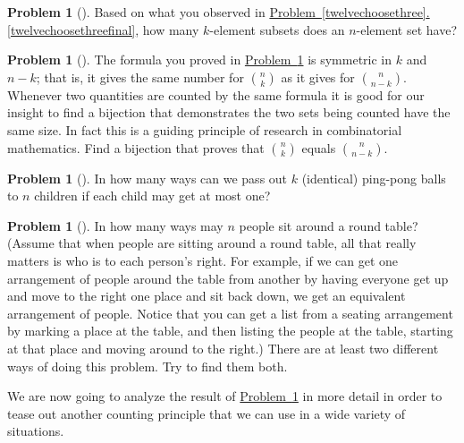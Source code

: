 \documentclass[10pt,]{book}
\theoremstyle{plain}
\theoremstyle{definition}
\newtheorem{activity}[project]{Problem}
\theoremstyle{definition}
\numberwithin{equation}{chapter}
\newcommand{\importantarrow}{\Rightarrow}
\begin{document}
\begin{activity}[] \label{nchoosek}
Based on what you observed in \hyperref[twelvechoosethreefinal]{Problem~\ref{twelvechoosethree}.\ref{twelvechoosethreefinal}}, how many \(k\)-element subsets does an \(n\)-element set have?%
\end{activity}
\begin{activity}[]\marginsymbol[-1em]{\pdftooltip{$\importantarrow$}{especially interesting}} \label{activity-36}
The formula you proved in \hyperref[nchoosek]{Problem~\ref{nchoosek}} is symmetric in \(k\) and \(n-k\); that is, it gives the same number for \(\binom{n}{k}\) as it gives for \(\binom{n}{n-k}\). Whenever two quantities are counted by the same formula it is good for our insight to find a bijection that demonstrates the two sets being counted have the same size. In fact this is a guiding principle of research in combinatorial mathematics. Find a bijection that proves that \(\binom{n}{k}\) equals \(\binom{n}{n-k}\).%
\end{activity}
\begin{activity}[] \label{ping-pong}
In how many ways can we pass out \(k\) (identical) ping-pong balls to \(n\) children if each child may get at most one?%
\end{activity}
\begin{activity}[] \label{roundtable}
In how many ways may \(n\) people sit around a round table? (Assume that when people are sitting around a round table, all that really matters is who is to each person's right. For example, if we can get one arrangement of people around the table from another by having everyone get up and move to the right one place and sit back down, we get an equivalent arrangement of people. Notice that you can get a list from a seating arrangement by marking a place at the table, and then listing the people at the table, starting at that place and moving around to the right.) There are at least two different ways of doing this problem. Try to find them both.%
\end{activity}
We are now going to analyze the result of \hyperref[nchoosek]{Problem~\ref{nchoosek}} in more detail in order to tease out another counting principle that we can use in a wide variety of situations.%
\end{document}
